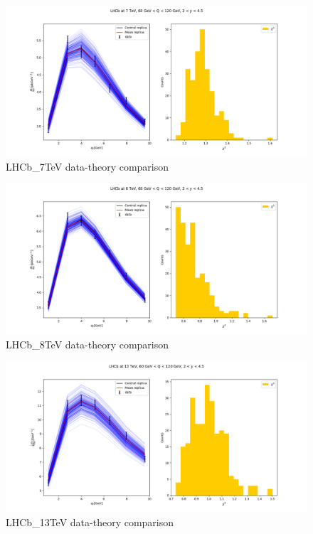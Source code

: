 \documentclass[
]{article}
\begin{document}
\begin{figure}
\centering
\includegraphics{pngplots/LHCb_7TeV.png}
\caption{LHCb\_7TeV data-theory comparison}
\end{figure}

\begin{figure}
\centering
\includegraphics{pngplots/LHCb_8TeV.png}
\caption{LHCb\_8TeV data-theory comparison}
\end{figure}

\begin{figure}
\centering
\includegraphics{pngplots/LHCb_13TeV.png}
\caption{LHCb\_13TeV data-theory comparison}
\end{figure}
\end{document}
